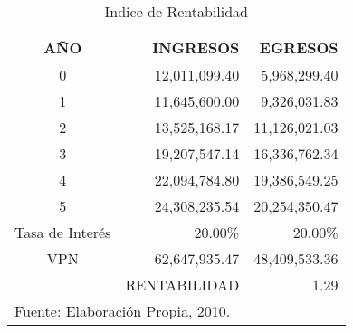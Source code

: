 \begin{table}[h]
    \caption{Indice de Rentabilidad}
    \label{tbl:Indice:Rentabilidad}
    \centering
    \begin{tabular}{c|r|r}
        AÑO             & INGRESOS      & EGRESOS \\
        \hline
        \hline
        0               & 12,011,099.40 & 5,968,299.40 \\
        1               & 11,645,600.00 & 9,326,031.83 \\
        2               & 13,525,168.17 & 11,126,021.03 \\
        3               & 19,207,547.14 & 16,336,762.34 \\
        4               & 22,094,784.80 & 19,386,549.25 \\
        5               & 24,308,235.54 & 20,254,350.47 \\
        \hline
        Tasa de Interés & 20.00\%       & 20.00\% \\
        VPN             & 62,647,935.47 & 48,409,533.36 \\
        \hline
                        & RENTABILIDAD  & 1.29 \\
		\hline
		\multicolumn{3}{l}{\footnotesize Fuente: Elaboración Propia, 2010.}
    \end{tabular}
\end{table}
